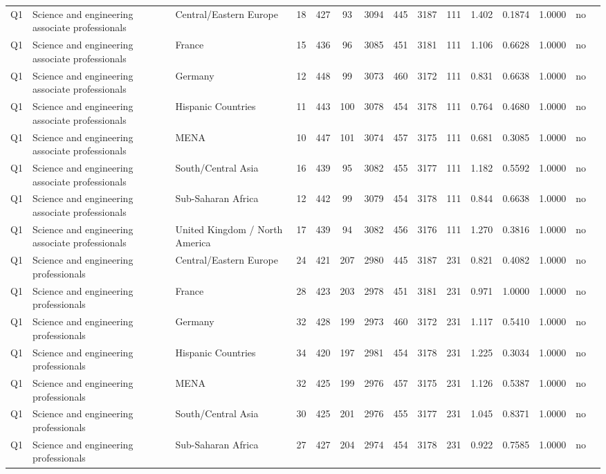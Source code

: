 \begin{longtable}{lllrcccccccccll}
Q1 & Science and engineering associate professionals & Central/Eastern Europe & 18 & 427 & 93 & 3094 & 445 & 3187 & 111 & 1.402 & 0.1874 & 1.0000 & no \\
Q1 & Science and engineering associate professionals & France & 15 & 436 & 96 & 3085 & 451 & 3181 & 111 & 1.106 & 0.6628 & 1.0000 & no \\
Q1 & Science and engineering associate professionals & Germany & 12 & 448 & 99 & 3073 & 460 & 3172 & 111 & 0.831 & 0.6638 & 1.0000 & no \\
Q1 & Science and engineering associate professionals & Hispanic Countries & 11 & 443 & 100 & 3078 & 454 & 3178 & 111 & 0.764 & 0.4680 & 1.0000 & no \\
Q1 & Science and engineering associate professionals & MENA & 10 & 447 & 101 & 3074 & 457 & 3175 & 111 & 0.681 & 0.3085 & 1.0000 & no \\
Q1 & Science and engineering associate professionals & South/Central Asia & 16 & 439 & 95 & 3082 & 455 & 3177 & 111 & 1.182 & 0.5592 & 1.0000 & no \\
Q1 & Science and engineering associate professionals & Sub-Saharan Africa & 12 & 442 & 99 & 3079 & 454 & 3178 & 111 & 0.844 & 0.6638 & 1.0000 & no \\
Q1 & Science and engineering associate professionals & United Kingdom / North America & 17 & 439 & 94 & 3082 & 456 & 3176 & 111 & 1.270 & 0.3816 & 1.0000 & no \\
Q1 & Science and engineering professionals & Central/Eastern Europe & 24 & 421 & 207 & 2980 & 445 & 3187 & 231 & 0.821 & 0.4082 & 1.0000 & no \\
Q1 & Science and engineering professionals & France & 28 & 423 & 203 & 2978 & 451 & 3181 & 231 & 0.971 & 1.0000 & 1.0000 & no \\
Q1 & Science and engineering professionals & Germany & 32 & 428 & 199 & 2973 & 460 & 3172 & 231 & 1.117 & 0.5410 & 1.0000 & no \\
Q1 & Science and engineering professionals & Hispanic Countries & 34 & 420 & 197 & 2981 & 454 & 3178 & 231 & 1.225 & 0.3034 & 1.0000 & no \\
Q1 & Science and engineering professionals & MENA & 32 & 425 & 199 & 2976 & 457 & 3175 & 231 & 1.126 & 0.5387 & 1.0000 & no \\
Q1 & Science and engineering professionals & South/Central Asia & 30 & 425 & 201 & 2976 & 455 & 3177 & 231 & 1.045 & 0.8371 & 1.0000 & no \\
Q1 & Science and engineering professionals & Sub-Saharan Africa & 27 & 427 & 204 & 2974 & 454 & 3178 & 231 & 0.922 & 0.7585 & 1.0000 & no \\

\end{longtable}

